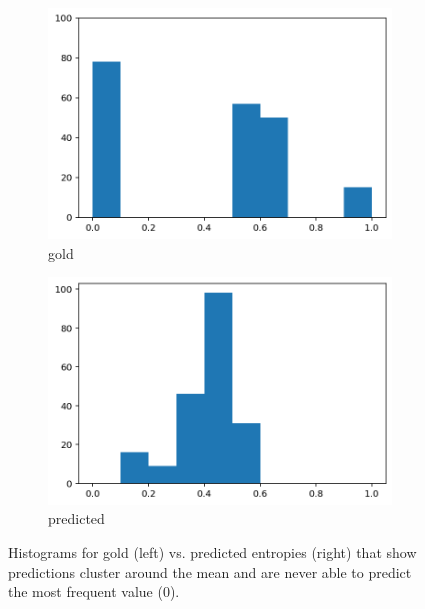 \begin{figure}[b]
 \centering
 \vspace{-1.2em}
  \begin{subfigure}{.5\textwidth}
  \centering
  \includegraphics[scale=0.3]{plots/subj_entropy_golds.png}
  \vspace{-.3em}
  \caption{gold}
\end{subfigure}%
  \begin{subfigure}{.5\textwidth}
  \centering
  \includegraphics[scale=0.3]{plots/subj_entropy_preds.png}
  \vspace{-.3em}
  \caption{predicted}
\end{subfigure}
\vspace{-0.5em}
  \caption{Histograms for gold (left) vs. predicted entropies (right) that show predictions cluster around the mean and are never able to predict the most frequent value (0).}
  \label{fig:subj_entropies}
  \vspace{-.3em}
\end{figure}

